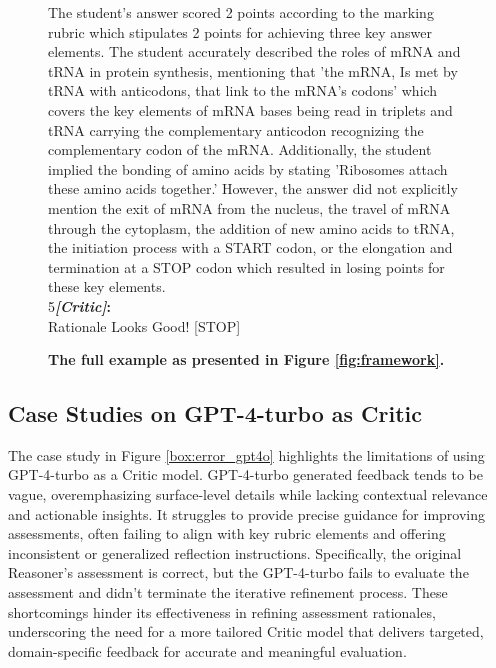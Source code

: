 \begin{figure*}
\begin{tcolorbox}[
    colback=gray!10,      %
    colframe=gray!80,     %
    title=Case Study 1,
    fonttitle=\bfseries,  %
    rounded corners,
    boxrule=0.5mm,        %
    width=\linewidth
]
The student's answer scored 2 points according to the marking rubric which stipulates 2 points for achieving three key answer elements. The student accurately described the roles of mRNA and tRNA in protein synthesis, mentioning that 'the mRNA, Is met by tRNA with anticodons, that link to the mRNA's codons' which covers the key elements of mRNA bases being read in triplets and tRNA carrying the complementary anticodon recognizing the complementary codon of the mRNA. Additionally, the student implied the bonding of amino acids by stating 'Ribosomes attach these amino acids together.' However, the answer did not explicitly mention the exit of mRNA from the nucleus, the travel of mRNA through the cytoplasm, the addition of new amino acids to tRNA, the initiation process with a START codon, or the elongation and termination at a STOP codon which resulted in losing points for these key elements.\\
\textcircled{\raisebox{-0.3pt} {\scriptsize5}}\textbf{\emph{[Critic]}:}\\
 Rationale Looks Good! [STOP]
\end{tcolorbox}
\caption{\textbf{The full example as presented in Figure \ref{fig:framework}.}}
\label{box:main_example}
\end{figure*}

\subsection{Case Studies on GPT-4-turbo as Critic} \label{sec:gpt4o_case_study}
The case study in Figure \ref{box:error_gpt4o} highlights the limitations of using GPT-4-turbo as a Critic model. GPT-4-turbo generated feedback tends to be vague, overemphasizing surface-level details while lacking contextual relevance and actionable insights. It struggles to provide precise guidance for improving assessments, often failing to align with key rubric elements and offering inconsistent or generalized reflection instructions. Specifically, the original Reasoner's assessment is correct, but the GPT-4-turbo fails to evaluate the assessment and didn't terminate the iterative refinement process. These shortcomings hinder its effectiveness in refining assessment rationales, underscoring the need for a more tailored Critic model that delivers targeted, domain-specific feedback for accurate and meaningful evaluation.

